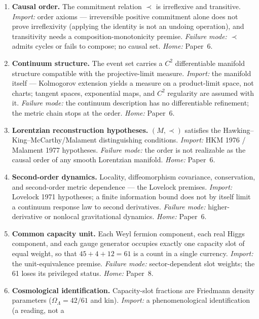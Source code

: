 \documentclass[11pt]{article}
\theoremstyle{definition}
\begin{document}
\begin{enumerate}[label=\textbf{BA\arabic*},leftmargin=3em]
  \item \textbf{Causal order.}  The commitment relation $\prec$ is
  irreflexive and transitive.  \emph{Import:} order axioms --- irreversible
  positive commitment alone does not prove irreflexivity (applying the
  identity is not an undoing operation), and transitivity needs a
  composition-monotonicity premise.  \emph{Failure mode:} $\prec$ admits
  cycles or fails to compose; no causal set.  \emph{Home:} Paper~6.
  \item \textbf{Continuum structure.}  The event set carries a $C^2$
  differentiable manifold structure compatible with the projective-limit
  measure.  \emph{Import:} the manifold itself --- Kolmogorov extension
  yields a measure on a product-limit space, not charts; tangent spaces,
  exponential maps, and $C^2$ regularity are assumed with it.
  \emph{Failure mode:} the continuum description has no differentiable
  refinement; the metric chain stops at the order.  \emph{Home:} Paper~6.
  \item \textbf{Lorentzian reconstruction hypotheses.}  $(M, \prec)$
  satisfies the Hawking--King--McCarthy\slash{}Malament distinguishing
  conditions.
  \emph{Import:} HKM 1976 / Malament 1977 hypotheses.  \emph{Failure mode:}
  the order is not realizable as the causal order of any smooth Lorentzian
  manifold.  \emph{Home:} Paper~6.
  \item \textbf{Second-order dynamics.}  Locality, diffeomorphism
  covariance, conservation, and second-order metric dependence --- the
  Lovelock premises.  \emph{Import:} Lovelock 1971 hypotheses; a finite
  information bound does not by itself limit a continuum response law to
  second derivatives.  \emph{Failure mode:} higher-derivative or nonlocal
  gravitational dynamics.  \emph{Home:} Paper~6.
  \item \textbf{Common capacity unit.}  Each Weyl fermion component, each
  real Higgs component, and each gauge generator occupies exactly one
  capacity slot of equal weight, so that $45 + 4 + 12 = 61$ is a count in
  a single currency.  \emph{Import:} the unit-equivalence premise.
  \emph{Failure mode:} sector-dependent slot weights; the 61 loses its
  privileged status.  \emph{Home:} Paper~8.
  \item \textbf{Cosmological identification.}  Capacity-slot fractions are
  Friedmann density parameters ($\Omega_\Lambda = 42/61$ and kin).
  \emph{Import:} a phenomenological identification (a reading, not a

\end{enumerate}
\end{document}
